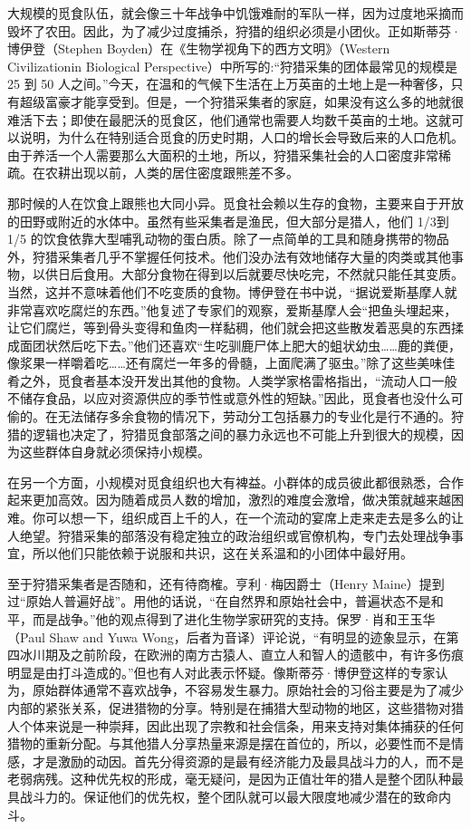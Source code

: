 大规模的觅食队伍，就会像三十年战争中饥饿难耐的军队一样，因为过度地采摘而毁坏了农田。因此，为了减少过度捕杀，狩猎的组织必须是小团伙。正如斯蒂芬·博伊登（Stephen Boyden）在《生物学视角下的西方文明》（Western Civilizationin Biological Perspective）中所写的:“狩猎采集的团体最常见的规模是 25 到 50 人之间。”今天，在温和的气候下生活在上万英亩的土地上是一种奢侈，只有超级富豪才能享受到。但是，一个狩猎采集者的家庭，如果没有这么多的地就很难活下去；即使在最肥沃的觅食区，他们通常也需要人均数千英亩的土地。这就可以说明，为什么在特别适合觅食的历史时期，人口的增长会导致后来的人口危机。由于养活一个人需要那么大面积的土地，所以，狩猎采集社会的人口密度非常稀疏。在农耕出现以前，人类的居住密度跟熊差不多。

那时候的人在饮食上跟熊也大同小异。觅食社会赖以生存的食物，主要来自于开放的田野或附近的水体中。虽然有些采集者是渔民，但大部分是猎人，他们 1/3到 1/5 的饮食依靠大型哺乳动物的蛋白质。除了一点简单的工具和随身携带的物品外，狩猎采集者几乎不掌握任何技术。他们没办法有效地储存大量的肉类或其他事物，以供日后食用。大部分食物在得到以后就要尽快吃完，不然就只能任其变质。当然，这并不意味着他们不吃变质的食物。博伊登在书中说，“据说爱斯基摩人就非常喜欢吃腐烂的东西。”他复述了专家们的观察，爱斯基摩人会“把鱼头埋起来，让它们腐烂，等到骨头变得和鱼肉一样黏稠，他们就会把这些散发着恶臭的东西揉成面团状然后吃下去。”他们还喜欢“生吃驯鹿尸体上肥大的蛆状幼虫……鹿的粪便，像浆果一样嚼着吃……还有腐烂一年多的骨髓，上面爬满了驱虫。”除了这些美味佳肴之外，觅食者基本没开发出其他的食物。人类学家格雷格指出，“流动人口一般不储存食品，以应对资源供应的季节性或意外性的短缺。”因此，觅食者也没什么可偷的。在无法储存多余食物的情况下，劳动分工包括暴力的专业化是行不通的。狩猎的逻辑也决定了，狩猎觅食部落之间的暴力永远也不可能上升到很大的规模，因为这些群体自身就必须保持小规模。

在另一个方面，小规模对觅食组织也大有裨益。小群体的成员彼此都很熟悉，合作起来更加高效。因为随着成员人数的增加，激烈的难度会激增，做决策就越来越困难。你可以想一下，组织成百上千的人，在一个流动的宴席上走来走去是多么的让人绝望。狩猎采集的部落没有稳定独立的政治组织或官僚机构，专门去处理战争事宜，所以他们只能依赖于说服和共识，这在关系温和的小团体中最好用。

至于狩猎采集者是否随和，还有待商榷。亨利·梅因爵士（Henry Maine）提到过“原始人普遍好战”。用他的话说，“在自然界和原始社会中，普遍状态不是和平，而是战争。”他的观点得到了进化生物学家研究的支持。保罗·肖和王玉华（Paul Shaw and Yuwa Wong，后者为音译）评论说，“有明显的迹象显示，在第四冰川期及之前阶段，在欧洲的南方古猿人、直立人和智人的遗骸中，有许多伤痕明显是由打斗造成的。”但也有人对此表示怀疑。像斯蒂芬·博伊登这样的专家认为，原始群体通常不喜欢战争，不容易发生暴力。原始社会的习俗主要是为了减少内部的紧张关系，促进猎物的分享。特别是在捕猎大型动物的地区，这些猎物对猎人个体来说是一种崇拜，因此出现了宗教和社会信条，用来支持对集体捕获的任何猎物的重新分配。与其他猎人分享热量来源是摆在首位的，所以，必要性而不是情感，才是激励的动因。首先分得资源的是最有经济能力及最具战斗力的人，而不是老弱病残。这种优先权的形成，毫无疑问，是因为正值壮年的猎人是整个团队种最具战斗力的。保证他们的优先权，整个团队就可以最大限度地减少潜在的致命内斗。

